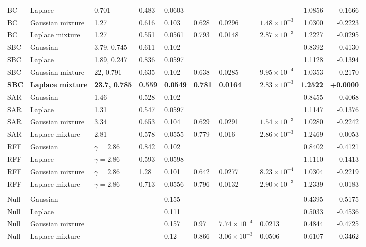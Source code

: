\begin{longtable}{llllllllrr}
BC & Laplace & 0.701 & 0.483 & 0.0603 &  &  &  & 1.0856 & -0.1666 \\
BC & Gaussian mixture & 1.27 & 0.616 & 0.103 & 0.628 & 0.0296 & $1.48\times10^{-3}$ & 1.0300 & -0.2223 \\
BC & Laplace mixture & 1.27 & 0.551 & 0.0561 & 0.793 & 0.0148 & $2.87\times10^{-3}$ & 1.2227 & -0.0295 \\
SBC & Gaussian & 3.79, 0.745 & 0.611 & 0.102 &  &  &  & 0.8392 & -0.4130 \\
SBC & Laplace & 1.89, 0.247 & 0.836 & 0.0597 &  &  &  & 1.1128 & -0.1394 \\
SBC & Gaussian mixture & 22, 0.791 & 0.635 & 0.102 & 0.638 & 0.0285 & $9.95\times10^{-4}$ & 1.0353 & -0.2170 \\
\textbf{SBC} & \textbf{Laplace mixture} & \textbf{23.7, 0.785} & \textbf{0.559} & \textbf{0.0549} & \textbf{0.781} & \textbf{0.0164} & \textbf{$2.83\times10^{-3}$} & \textbf{1.2522} & \textbf{+0.0000} \\
SAR & Gaussian & 1.46 & 0.528 & 0.102 &  &  &  & 0.8455 & -0.4068 \\
SAR & Laplace & 1.31 & 0.547 & 0.0597 &  &  &  & 1.1147 & -0.1376 \\
SAR & Gaussian mixture & 3.34 & 0.653 & 0.104 & 0.629 & 0.0291 & $1.54\times10^{-3}$ & 1.0280 & -0.2242 \\
SAR & Laplace mixture & 2.81 & 0.578 & 0.0555 & 0.779 & 0.016 & $2.86\times10^{-3}$ & 1.2469 & -0.0053 \\
RFF & Gaussian & $\gamma=2.86$ & 0.842 & 0.102 &  &  &  & 0.8402 & -0.4121 \\
RFF & Laplace & $\gamma=2.86$ & 0.593 & 0.0598 &  &  &  & 1.1110 & -0.1413 \\
RFF & Gaussian mixture & $\gamma=2.86$ & 1.28 & 0.101 & 0.642 & 0.0277 & $8.23\times10^{-4}$ & 1.0304 & -0.2219 \\
RFF & Laplace mixture & $\gamma=2.86$ & 0.713 & 0.0556 & 0.796 & 0.0132 & $2.90\times10^{-3}$ & 1.2339 & -0.0183 \\
\midrule
\multicolumn{10}{l}{\takacsCtl{}} \\
Null & Gaussian &  &  & 0.155 &  &  &  & 0.4395 & -0.5175 \\
Null & Laplace &  &  & 0.111 &  &  &  & 0.5033 & -0.4536 \\
Null & Gaussian mixture &  &  & 0.157 & 0.97 & $7.74\times10^{-4}$ & 0.0213 & 0.4844 & -0.4725 \\
Null & Laplace mixture &  &  & 0.12 & 0.866 & $3.06\times10^{-3}$ & 0.0506 & 0.6107 & -0.3462 \\

\end{longtable}
